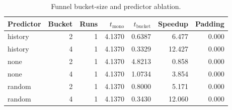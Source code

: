 \begin{table}[t]
\centering
\caption{Funnel bucket-size and predictor ablation.}
\label{tab:bucket-ablation}
\begin{tabular}{lrrrrrr}
\hline
Predictor & Bucket & Runs & $t_{\mathrm{mono}}$ & $t_{\mathrm{bucket}}$ & Speedup & Padding \\
\hline
history & 2 & 1 & 4.1370 & 0.6387 & 6.477 & 0.000 \\
history & 4 & 1 & 4.1370 & 0.3329 & 12.427 & 0.000 \\
none & 2 & 1 & 4.1370 & 4.8213 & 0.858 & 0.000 \\
none & 4 & 1 & 4.1370 & 1.0734 & 3.854 & 0.000 \\
random & 2 & 1 & 4.1370 & 0.8000 & 5.171 & 0.000 \\
random & 4 & 1 & 4.1370 & 0.3430 & 12.060 & 0.000 \\
\hline
\end{tabular}
\end{table}

